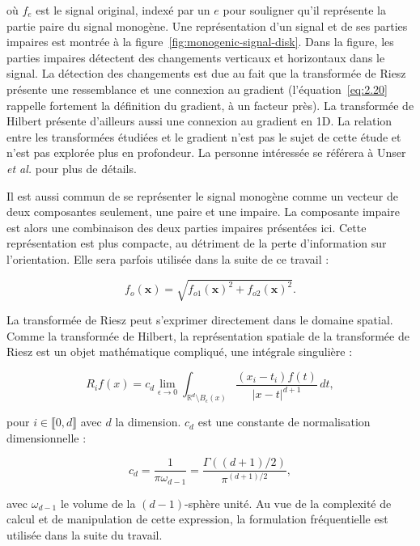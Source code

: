 où $f_e$ est le signal original, indexé par un $e$ pour souligner qu'il représente la partie paire du signal monogène. Une représentation d'un signal et de ses parties impaires est montrée à la figure~\ref{fig:monogenic-signal-disk}. Dans la figure, les parties impaires détectent des changements verticaux et horizontaux dans le signal. La détection des changements est due au fait que la transformée de Riesz présente une ressemblance et une connexion au gradient (l'équation~\ref{eq:2.20} rappelle fortement la définition du gradient, à un facteur près). La transformée de Hilbert présente d'ailleurs aussi une connexion au gradient en 1D. La relation entre les transformées étudiées et le gradient n'est pas le sujet de cette étude et n'est pas explorée plus en profondeur. La personne intéressée se référera à Unser \textit{et al.}\cite{unser_multiresolution_2009} pour plus de détails.

\bigskip

Il est aussi commun de se représenter le signal monogène comme un vecteur de deux composantes seulement, une paire et une impaire. La composante impaire est alors une combinaison des deux parties impaires présentées ici. Cette représentation est plus compacte, au détriment de la perte d'information sur l'orientation. Elle sera parfois utilisée dans la suite de ce travail :

\begin{equation}
    f_o(\mathbf{x}) = \sqrt{f_{o1}(\mathbf{x})^2 + f_{o2}(\mathbf{x})^2}.
\end{equation}

La transformée de Riesz peut s'exprimer directement dans le domaine spatial. Comme la transformée de Hilbert, la représentation spatiale de la transformée de Riesz est un objet mathématique compliqué, une intégrale singulière :

\begin{equation}
    R_if(x) = c_d \lim_{\epsilon \to 0}\int_{\mathbb{R}^d\setminus B_\epsilon(x)}\frac{(x_i-t_i)f(t)}{|x-t|^{d+1}}\,dt,
    \label{eq:riesz-transform-spatial}
\end{equation}

pour $i\in\llbracket 0, d\rrbracket$ avec $d$ la dimension. $c_d$ est une constante de normalisation dimensionnelle :

\begin{equation}
    c_d = \frac1{\pi\omega_{d-1}} = \frac{\Gamma((d+1)/2)}{\pi^{(d+1)/2}},
\end{equation}

avec $\omega_{d-1}$ le volume de la $(d-1)$-sphère unité. Au vue de la complexité de calcul et de manipulation de cette expression, la formulation fréquentielle est utilisée dans la suite du travail.

